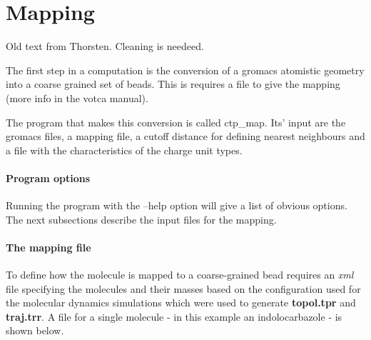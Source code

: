 \chapter{Mapping}
{\color{red} Old text from Thorsten. Cleaning is needeed.}

The first step in a computation is the conversion of a gromacs atomistic geometry into a coarse grained set of beads. This is requires a file to give the mapping (more info in the votca manual). 

The program that makes this conversion is called ctp\_map. Its' input are the gromacs files, a mapping file, a cutoff distance for defining nearest neighbours and a file with the characteristics of the charge unit types.

\subsubsection{Program options}

Running the program with the --help option will give a list of obvious options. The next subsections describe the input files for the mapping.

\subsubsection{The mapping file}

To define how the molecule is mapped to a coarse-grained bead requires an \emph{xml} file specifying the molecules and their masses based on the configuration used for the molecular dynamics simulations which were used to generate {\bf topol.tpr} and {\bf traj.trr}. A file for a single molecule - in this example an indolocarbazole - is shown below.

